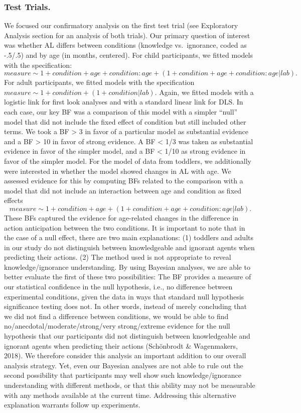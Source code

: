 \documentclass[
  man,floatsintext]{apa6}
\begin{document}
\subsubsection{Test Trials.}\label{test-trials.}

We focused our confirmatory analysis on the first test trial (see Exploratory Analysis section for an analysis of both trials). Our primary question of interest was whether AL differs between conditions (knowledge vs.~ignorance, coded as -.5/.5) and by age (in months, centered). For child participants, we fitted models with the specification:
\(measure \sim 1 + condition + age + condition:age + (1 + condition + age + condition:age | lab).\)
For adult participants, we fitted models with the specification
\(measure \sim 1 + condition + (1 + condition | lab).\)
Again, we fitted models with a logistic link for first look analyses and with a standard linear link for DLS.
In each case, our key BF was a comparison of this model with a simpler ``null'' model that did not include the fixed effect of condition but still included other terms. We took a BF \textgreater{} 3 in favor of a particular model as substantial evidence and a BF \textgreater{} 10 in favor of strong evidence. A BF \textless{} 1/3 was taken as substantial evidence in favor of the simpler model, and a BF \textless{} 1/10 as strong evidence in favor of the simpler model.
For the model of data from toddlers, we additionally were interested in whether the model showed changes in AL with age. We assessed evidence for this by computing BFs related to the comparison with a model that did not include an interaction between age and condition as fixed effects
\[measure \sim 1 + condition + age + (1 + condition + age + condition:age | lab).\]
These BFs captured the evidence for age-related changes in the difference in action anticipation between the two conditions.
It is important to note that in the case of a null effect, there are two main explanations: (1) toddlers and adults in our study do not distinguish between knowledgeable and ignorant agents when predicting their actions. (2) The method used is not appropriate to reveal knowledge/ignorance understanding. By using Bayesian analyses, we are able to better evaluate the first of these two possibilities: The BF provides a measure of our statistical confidence in the null hypothesis, i.e., no difference between experimental conditions, given the data in ways that standard null hypothesis significance testing does not. In other words, instead of merely concluding that we did not find a difference between conditions, we would be able to find no/anecdotal/moderate/strong/very strong/extreme evidence for the null hypothesis that our participants did not distinguish between knowledgeable and ignorant agents when predicting their actions (Schönbrodt \& Wagenmakers, 2018). We therefore consider this analysis an important addition to our overall analysis strategy. Yet, even our Bayesian analyses are not able to rule out the second possibility that participants may well show such knowledge/ignorance understanding with different methods, or that this ability may not be measurable with any methods available at the current time. Addressing this alternative explanation warrants follow up experiments.
\end{document}
